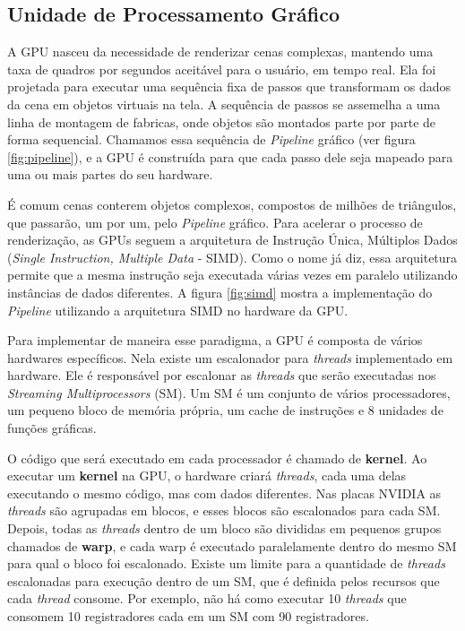 \subsection{Unidade de Processamento Gráfico}
    A GPU nasceu da necessidade de renderizar cenas complexas, mantendo uma taxa de quadros por segundos
aceitável para o usuário, em tempo real. Ela foi projetada para executar uma sequência fixa de passos que transformam
os dados da cena em objetos virtuais na tela. A sequência de passos se assemelha a uma linha de montagem de fabricas,
onde objetos são montados parte por parte de forma sequencial. Chamamos essa sequência de \textit{Pipeline} gráfico 
(ver figura \ref{fig:pipeline}), e a GPU é construída para que cada passo dele seja mapeado para uma ou mais partes do 
seu hardware.

    É comum cenas conterem objetos complexos, compostos de milhões de triângulos, que passarão, um por um, pelo
\textit{Pipeline} gráfico. Para acelerar o processo de renderização, as GPUs seguem a arquitetura de Instrução Única,
Múltiplos Dados (\textit{Single Instruction, Multiple Data} - SIMD). Como o nome já diz, essa arquitetura permite que 
a mesma instrução seja executada várias vezes em paralelo utilizando instâncias de dados diferentes. A figura 
\ref{fig:simd} mostra a implementação do \textit{Pipeline} utilizando a arquitetura SIMD no hardware da GPU.
    
    Para implementar de maneira esse paradigma, a GPU é composta de vários hardwares específicos. Nela existe um 
escalonador para \textit{threads} implementado em hardware. Ele é responsável por escalonar as \textit{threads} que serão
executadas nos \textit{Streaming Multiprocessors} (SM). Um SM é um conjunto de vários processadores, um pequeno bloco de
memória própria, um cache de instruções e 8 unidades de funções gráficas.

    O código que será executado em cada processador é chamado de \textbf{kernel}. Ao executar um \textbf{kernel} na GPU, o 
hardware criará \textit{threads}, cada uma delas executando o mesmo código, mas com dados diferentes. Nas placas NVIDIA as \textit{threads} 
são agrupadas em blocos, e esses blocos são escalonados para cada SM. Depois, todas as \textit{threads} dentro de um bloco são 
divididas em pequenos grupos chamados de \textbf{warp}, e cada warp é executado paralelamente dentro do 
mesmo SM para qual o bloco foi escalonado. Existe um limite para a quantidade de \textit{threads} escalonadas para execução
dentro de um SM, que é definida pelos recursos que cada \textit{thread} consome. Por exemplo, não há como executar 10 \textit{threads}
que consomem 10 registradores cada em um SM com 90 registradores.

